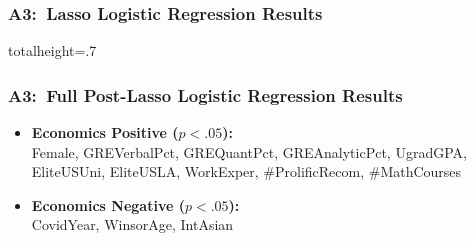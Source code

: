 \documentclass[12pt, aspectratio=169]{beamer}
\begin{document}
\begin{frame}[label=llrr]
\frametitle{A3:\ Lasso Logistic Regression Results}
\begin{table}[htbp]
\begin{center}
\caption{Lasso Logistic Regression Results}
\vspace{5pt}
\begin{adjustbox}{totalheight=.7\textheight}
\resizebox*{!}{\dimexpr\textheight-3.5\baselineskip\relax}{
}
\end{adjustbox}
\end{center}
\end{table}
\hyperlink{pllra}{}
\end{frame}

\begin{frame}[label=fpllrr]
\frametitle{A3:\ Full Post-Lasso Logistic Regression Results}
\centering
\renewcommand{\thetable}{\arabic{table}a}
\vspace{-7.5pt}
\begin{minipage}[t]{0.3\textwidth}
\end{minipage}%
\hfill
\begin{minipage}[c][0.8\textheight][c]{0.7\textwidth}
\begin{itemize}
\item \textbf{Economics Positive ($p<.05$):}\ \\ Female, GREVerbalPct, GREQuantPct, GREAnalyticPct, UgradGPA, EliteUSUni, EliteUSLA, WorkExper, \#ProlificRecom, \#MathCourses
\vspace{10pt}
\item \textbf{Economics Negative ($p<.05$):}\ \\ CovidYear, WinsorAge, IntAsian
\end{itemize}
\end{minipage}
\raggedright
\hyperlink{pllra}{}
\end{frame}
\end{document}
